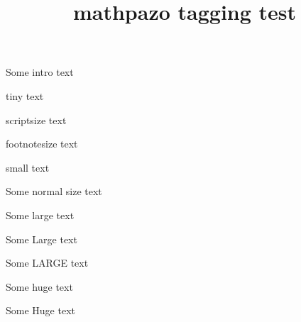 \documentclass{article}
\title{mathpazo tagging test}
\begin{document}
{\Large Some intro text}

{\tiny tiny text}

{\scriptsize scriptsize text}

{\footnotesize footnotesize text}

{\small small text}

{\normalsize Some normal size text}

{\large Some large text}

{\Large Some Large text}

{\LARGE Some LARGE text}

{\huge Some huge text}

{\Huge Some Huge text}
\end{document}
